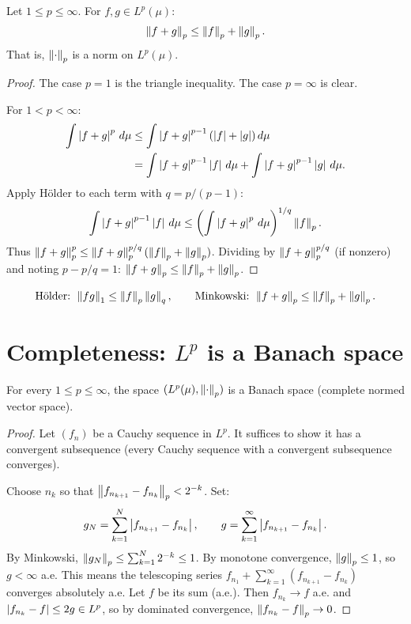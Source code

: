 \begin{theorem}
\label{thm:minkowski}
Let $1 \leq p \leq \infty$. For $f, g \in L^p(\mu)$:
\[
\left\| f + g \right\|_p \leq \left\| f \right\|_p + \left\| g \right\|_p.
\]
That is, $\left\| \cdot \right\|_p$ is a norm on $L^p(\mu)$.
\end{theorem}

\begin{proof}
The case $p = 1$ is the triangle inequality. The case $p = \infty$ is clear.

For $1 < p < \infty$:
\begin{align*}
\int \left| f + g \right|^p\, d\mu &\leq \int \left| f + g \right|^{p-1}(\left| f \right| + \left| g \right|)\, d\mu
\\
&= \int \left| f + g \right|^{p-1}\left| f \right|\, d\mu + \int \left| f + g \right|^{p-1}\left| g \right|\, d\mu.
\end{align*}
Apply H\"older to each term with $q = p/(p-1)$:
\[
\int \left| f + g \right|^{p-1}\left| f \right|\, d\mu \leq
\left(\int \left| f + g \right|^p\, d\mu\right)^{1/q} \left\| f \right\|_p.
\]
Thus $\left\| f + g \right\|_p^p \leq \left\| f + g \right\|_p^{p/q}(\left\| f \right\|_p + \left\| g \right\|_p)$.
Dividing by $\left\| f + g \right\|_p^{p/q}$ (if nonzero) and noting $p - p/q = 1$:
$\left\| f + g \right\|_p \leq \left\| f \right\|_p + \left\| g \right\|_p$.
\end{proof}

\begin{keyformulas}[title=\textbf{Fundamental inequalities}]
\[
\text{H\"older: } \left\| fg \right\|_1 \leq \left\| f \right\|_p \left\| g \right\|_q, \qquad
\text{Minkowski: } \left\| f + g \right\|_p \leq \left\| f \right\|_p + \left\| g \right\|_p.
\]
\end{keyformulas}

\section{Completeness: $L^p$ is a Banach space}

\begin{theorem}
\label{thm:riesz_fischer}
For every $1 \leq p \leq \infty$, the space $(L^p(\mu), \left\| \cdot \right\|_p)$ is a
Banach space (complete normed vector space).
\end{theorem}

\begin{proof}
Let $(f_n)$ be a Cauchy sequence in $L^p$. It suffices to show it has a convergent
subsequence (every Cauchy sequence with a convergent subsequence converges).

Choose $n_k$ so that $\left\| f_{n_{k+1}} - f_{n_k} \right\|_p < 2^{-k}$. Set:
\[
g_N = \sum_{k=1}^{N} \left| f_{n_{k+1}} - f_{n_k} \right|, \qquad
g = \sum_{k=1}^{\infty} \left| f_{n_{k+1}} - f_{n_k} \right|.
\]
By Minkowski, $\left\| g_N \right\|_p \leq \sum_{k=1}^N 2^{-k} \leq 1$. By monotone
convergence, $\left\| g \right\|_p \leq 1$, so $g < \infty$ a.e. This means the telescoping
series $f_{n_1} + \sum_{k=1}^{\infty}(f_{n_{k+1}} - f_{n_k})$ converges absolutely
a.e. Let $f$ be its sum (a.e.). Then $f_{n_k} \to f$ a.e. and
$\left| f_{n_k} - f \right| \leq 2g \in L^p$, so by dominated convergence,
$\left\| f_{n_k} - f \right\|_p \to 0$.
\end{proof}

